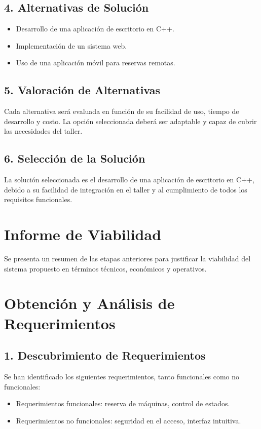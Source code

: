 \documentclass[12pt]{article}
\begin{document}
\subsection{4. Alternativas de Solución}
\begin{itemize}
    \item Desarrollo de una aplicación de escritorio en C++.
    \item Implementación de un sistema web.
    \item Uso de una aplicación móvil para reservas remotas.
\end{itemize}

\subsection{5. Valoración de Alternativas}
Cada alternativa será evaluada en función de su facilidad de uso, tiempo de desarrollo y costo. La opción seleccionada deberá ser adaptable y capaz de cubrir las necesidades del taller.

\subsection{6. Selección de la Solución}
La solución seleccionada es el desarrollo de una aplicación de escritorio en C++, debido a su facilidad de integración en el taller y al cumplimiento de todos los requisitos funcionales.

\newpage
\section{Informe de Viabilidad}
Se presenta un resumen de las etapas anteriores para justificar la viabilidad del sistema propuesto en términos técnicos, económicos y operativos.

\section{Obtención y Análisis de Requerimientos}

\subsection{1. Descubrimiento de Requerimientos}
Se han identificado los siguientes requerimientos, tanto funcionales como no funcionales:
\begin{itemize}
    \item Requerimientos funcionales: reserva de máquinas, control de estados.
    \item Requerimientos no funcionales: seguridad en el acceso, interfaz intuitiva.
\end{itemize}
\end{document}
